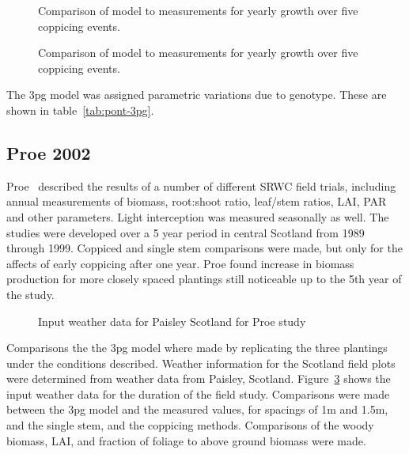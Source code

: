 \documentclass[10pt]{article}
\begin{document}
\begin{figure}[!ht]
  \centering
  
  \caption{Comparison of model to measurements for yearly growth over five
    coppicing events.}
\label{fig:pont-biomass}
\end{figure}

\begin{figure}[!ht]
  \centering
  
  \caption{Comparison of model to measurements for yearly growth over five
    coppicing events.}
\label{fig:afas-biomass}
\end{figure}


The \ac{3pg}
model was assigned parametric variations due to genotype.  These are
shown in table~\ref{tab:pont-3pg}.

\begin{table}[!ht]
  \centering
  \caption{\ac{3pg} parameter variations of \ac{3pg} among genotypes}
  \label{tab:pont-3pg}
\end{table}


\subsection*{Proe 2002}

Proe~\cite{Proe2002} described the results of a number of different
\ac{SRWC} field trials, including annual measurements of biomass,
root:shoot ratio, leaf/stem ratios, LAI, PAR and other parameters.
Light interception was measured seasonally as well.  The studies were
developed over a 5 year period in central Scotland from 1989 through
1999. Coppiced and single stem comparisons
were made, but only for the affects of early coppicing after one year.
Proe found increase in biomass production for more closely spaced
plantings still noticeable up to the 5th year of the study.

\begin{figure}
  \centering
  
  \caption{Input weather data for Paisley Scotland for Proe study}
  \label{fig:proe-weather}
\end{figure}

Comparisons the the \ac{3pg} model where made by replicating the three
plantings under the conditions described.  Weather information for the
Scotland field plots were determined from weather data from Paisley,
Scotland.  Figure~\ref{fig:proe-weather} shows the input weather data
for the duration of the field study.  Comparisons were made between
the \ac{3pg} model and the measured values, for spacings of 1m and
1.5m, and the single stem, and the coppicing methods.  Comparisons of
the woody biomass, \ac{LAI}, and fraction of foliage to above ground
biomass were made.
\end{document}
